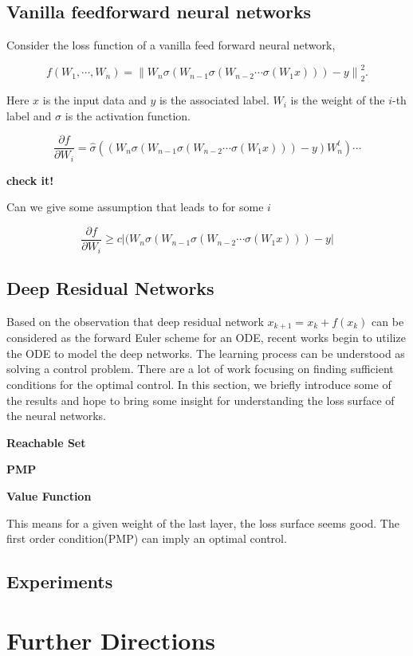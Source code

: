 \documentclass{article}
\theoremstyle{plain}
\theoremstyle{definition}
\begin{document}
\subsection{Vanilla feedforward neural networks}
Consider the loss function of a vanilla feed forward neural network,

$$f(W_1,\cdots,W_n)=\left\|W_n\sigma (W_{n-1}\sigma(W_{n-2}\cdots\sigma(W_1x)))-y\right\|_2^2.$$

Here $x$ is the input data and $y$ is the associated label. $W_i$ is the weight of the $i$-th label and $\sigma$ is the activation function.


$$
\frac{\partial f}{\partial W_i}=\hat\sigma((W_n\sigma (W_{n-1}\sigma(W_{n-2}\cdots\sigma(W_1x)))-y)W_n^t)\cdots
$$

\textbf{check it!} 

Can we give some assumption that leads to for some $i$

$$
\frac{\partial f}{\partial W_i} \ge c|(W_n\sigma (W_{n-1}\sigma(W_{n-2}\cdots\sigma(W_1x)))-y|
$$

\subsection{Deep Residual Networks}

Based on the observation that deep residual network $x_{k+1}=x_{k}+f(x_k)$ can be considered as the forward Euler scheme for an ODE, recent works begin to utilize the ODE to model the deep networks. The learning process can be understood as solving a control problem. There are a lot of work focusing on finding sufficient conditions for the optimal control. In this section, we briefly introduce some of the results and hope to bring some insight for understanding the loss surface of the neural networks.

\textbf{Reachable Set}

\textbf{PMP}

\textbf{Value Function}

This means for a given weight of the last layer, the loss surface seems good. The first order condition(PMP) can imply an optimal control. 

\subsection{Experiments}

\section{Further Directions}
\end{document}
